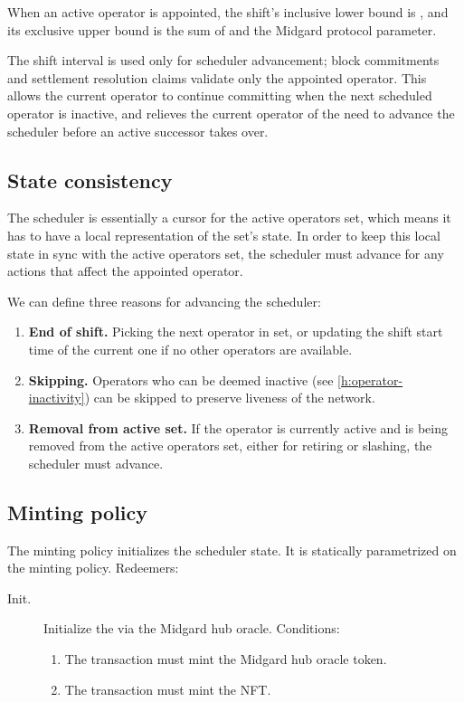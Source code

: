 \documentclass[../midgard.tex]{subfiles}
\begin{document}
When an active operator is appointed, the shift's inclusive lower bound is , and its exclusive upper bound is the sum of  and the  Midgard protocol parameter.

The shift interval is used only for scheduler advancement; block commitments and settlement resolution claims validate only the appointed operator.
This allows the current operator to continue committing when the next scheduled operator is inactive, and relieves the current operator of the need to advance the scheduler before an active successor takes over.

\subsection{State consistency}
\label{h:scheduler-state-consistency}

The scheduler is essentially a cursor for the active operators set, which means it has to have a local representation of the set's state.
In order to keep this local state in sync with the active operators set, the scheduler must advance for any actions that affect the appointed operator.

We can define three reasons for advancing the scheduler:
\begin{enumerate}
  \item \textbf{End of shift.} Picking the next operator in set, or updating the shift start time of the current one if no other operators are available.
  \item \textbf{Skipping.} Operators who can be deemed inactive (see \cref{h:operator-inactivity}) can be skipped to preserve liveness of the network.
  \item \textbf{Removal from active set.} If the operator is currently active and is being removed from the active operators set, either for retiring or slashing, the scheduler must advance.
\end{enumerate}

\subsection{Minting policy}
\label{h:scheduler-minting-policy}

The  minting policy initializes the scheduler state.
It is statically parametrized on the  minting policy.
Redeemers:

\begin{description}
    \item[Init.] Initialize the  via the Midgard hub oracle.
      Conditions:
        \begin{enumerate}
            \item The transaction must mint the Midgard hub oracle token.
            \item The transaction must mint the  NFT.
        \end{enumerate}
\end{description}
\end{document}
